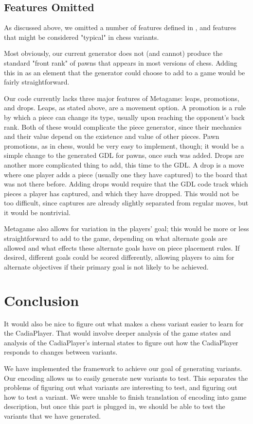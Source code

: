 \documentclass[11pt,letterpaper]{article}
\begin{document}
\subsection{Features Omitted}

As discussed above, we omitted a number of features defined in \cite{metagame},
and features that might be considered "typical" in chess variants.

Most obviously, our current generator does not (and cannot) produce the standard
"front rank" of pawns that appears in most versions of chess. Adding this in as
an element that the generator could choose to add to a game would be fairly
straightforward.

Our code currently lacks three major features of Metagame: leaps, promotions,
and drops. Leaps, as stated above, are a movement option. A promotion is a rule
by which a piece can change its type, usually upon reaching the opponent's back
rank. Both of these would complicate the piece generator, since their mechanics
and their value depend on the existence and value of other pieces. Pawn
promotions, as in chess, would be very easy to implement, though; it would be a
simple change to the generated GDL for pawns, once such was added. Drops are
another more complicated thing to add, this time to the GDL. A drop is a move
where one player adds a piece (usually one they have captured) to the board that
was not there before. Adding drops would require that the GDL code track which
pieces a player has captured, and which they have dropped. This would not be too
difficult, since captures are already slightly separated from regular moves, but
it would be nontrivial.

Metagame also allows for variation in the players' goal; this would be more or
less straightforward to add to the game, depending on what alternate goals are
allowed and what effects these alternate goals have on piece placement rules. If
desired, different goals could be scored differently, allowing players to aim
for alternate objectives if their primary goal is not likely to be achieved.

\section{Conclusion}
It would also be nice to figure out what makes a chess variant easier to learn for the CadiaPlayer. That would involve deeper analysis of the game states and analysis of the CadiaPlayer's internal states to figure out how the CadiaPlayer responds to changes between variants.

We have implemented the framework to achieve our goal of generating variants. Our encoding allows us to easily generate new variants to test. This separates the problems of figuring out what variants are interesting to test, and figuring out how to test a variant. We were unable to finish translation of encoding into game description, but once this part is plugged in, we should be able to test the variants that we have generated.

\printbibliography
\end{document}
